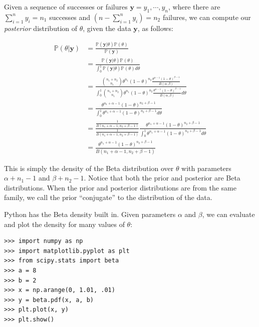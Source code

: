  Given a sequence of successes or failures $\mathbf{y} = y_{1},\cdots,y_{n}$, where there are $\sum_{i=1}^n y_i = n_{1}$ successes and $(n - \sum_{i=1}^n y_i) = n_{2}$ failures, we can compute our \emph{posterior} distribution of $\theta$, given the data $\mathbf{y}$, as follows:

\begin{align*}
\mathbb{P}(\theta | \mathbf{y}) & = \frac{\mathbb{P}(\mathbf{y} | \theta)\mathbb{P}(\theta)}{\mathbb{P}(\mathbf{y})} \\
& = \frac{\mathbb{P}(\mathbf{y} | \theta)\mathbb{P}(\theta)}{\int_{0}^{1} \mathbb{P}(\mathbf{y} | \theta)\mathbb{P}(\theta) d\theta} \\
& = \frac{{n_{1} + n_{2} \choose n_{1}} \theta^{n_{1}}(1-\theta)^{n_{2}} \frac{\theta^{\alpha - 1}(1 - \theta)^{\beta - 1}}{B(\alpha,\beta)}}{\int_{0}^{1} {n_{1} + n_{2} \choose n_{1}} \theta^{n_{1}}(1-\theta)^{n_{2}} \frac{\theta^{\alpha - 1}(1 - \theta)^{\beta - 1}}{B(\alpha,\beta)} d\theta} \\
& = \frac{ \theta^{n_{1} + \alpha - 1}(1-\theta)^{n_{2} + \beta - 1}}{\int_{0}^{1} \theta^{n_{1} + \alpha - 1}(1-\theta)^{n_{2} + \beta - 1} d\theta} \\
& = \frac{\frac{1}{B(n_{1} + \alpha - 1, n_{2} + \beta - 1)}}{\frac{1}{B(n_{1} + \alpha - 1, n_{2} + \beta - 1)}} \frac{ \theta^{n_{1} + \alpha - 1}(1-\theta)^{n_{2} + \beta - 1}}{\int_{0}^{1} \theta^{n_{1} + \alpha - 1}(1-\theta)^{n_{2} + \beta - 1} d\theta} \\
& = \frac{ \theta^{n_{1} + \alpha - 1}(1-\theta)^{n_{2} + \beta - 1}}{B(n_{1} + \alpha - 1, n_{2} + \beta - 1)}
\end{align*}

This is simply the density of the Beta distribution over $\theta$ with parameters $\alpha + n_{1} - 1$ and $\beta + n_{2} - 1$. Notice that both the prior and posterior are Beta distributions. When the prior and posterior distributions are from the same family, we call the prior ``conjugate'' to the distribution of the data. 

Python has the Beta density built in. Given parameters $\alpha$ and $\beta$, we can evaluate and plot the density for many values of $\theta$:

\begin{lstlisting}
>>> import numpy as np
>>> import matplotlib.pyplot as plt
>>> from scipy.stats import beta
>>> a = 8
>>> b = 2
>>> x = np.arange(0, 1.01, .01)
>>> y = beta.pdf(x, a, b)
>>> plt.plot(x, y)
>>> plt.show()
\end{lstlisting}

